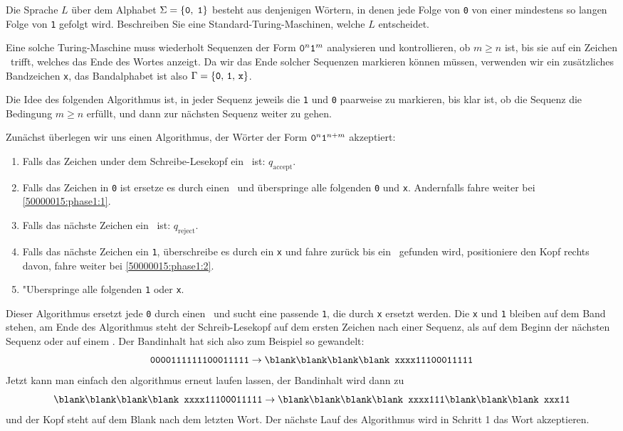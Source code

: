 Die Sprache $L$ über dem Alphabet $\Sigma = \{{\tt 0},\;{\tt 1}\}$
besteht aus denjenigen Wörtern, in denen jede Folge von {\tt 0}
von einer mindestens so langen Folge von {\tt 1} gefolgt wird.
Beschreiben Sie eine Standard-Turing-Maschinen, welche $L$
entscheidet.

\begin{loesung}
Eine solche Turing-Maschine muss wiederholt Sequenzen der
Form ${\tt 0}^n{\tt 1}^m$ analysieren und kontrollieren, ob $m \ge n$ ist,
bis sie auf ein Zeichen \blank\ trifft, welches das Ende des
Wortes anzeigt. Da wir das Ende solcher Sequenzen markieren 
können müssen, verwenden wir ein zusätzliches Bandzeichen
{\tt x}, das Bandalphabet ist also $\Gamma
=\{{\tt 0},\,{\tt 1},\,{\tt x}\}$.

Die Idee des folgenden Algorithmus ist, in jeder Sequenz jeweils
die {\tt 1} und {\tt 0} paarweise zu markieren, bis klar ist,
ob die Sequenz die Bedingung $m\ge n$ erfüllt, und dann zur
nächsten Sequenz weiter zu gehen.

Zunächst überlegen wir uns einen Algorithmus, der Wörter der Form
${\tt 0}^n{\tt 1}^{n+m}$ akzeptiert:
\begin{enumerate}
\item Falls das Zeichen under dem Schreibe-Lesekopf ein \blank\ ist:
$q_\text{accept}$.
\item
\label{50000015:phase1:2}
Falls das Zeichen in {\tt 0} ist ersetze es durch einen \blank\ und
überspringe alle folgenden {\tt 0} und {\tt x}.
Andernfalls fahre weiter bei \ref{50000015:phase1:1}.
\item
Falls das nächste Zeichen ein \blank\ ist: $q_\text{reject}$.
\item
Falls das nächste Zeichen ein {\tt 1}, überschreibe es durch ein {\tt x}
und fahre zurück bis ein \blank\ gefunden wird, positioniere den Kopf
rechts davon, fahre weiter bei \ref{50000015:phase1:2}.
\item
\label{50000015:phase1:1}
"Uberspringe alle folgenden {\tt 1} oder {\tt x}.
\end{enumerate}
Dieser Algorithmus ersetzt jede {\tt 0} durch einen \blank\ und sucht eine
passende {\tt 1}, die durch {\tt x} ersetzt werden.
Die {\tt x} und {\tt 1} bleiben auf dem Band stehen, am Ende des Algorithmus
steht der Schreib-Lesekopf auf dem ersten Zeichen nach einer Sequenz,
als auf dem Beginn der nächsten Sequenz oder auf einem \blank.
Der Bandinhalt hat sich also zum Beispiel so gewandelt:
\[
\text {\tt 0000111111100011111}
\rightarrow
\text {\tt \blank\blank\blank\blank xxxx11100011111}
\]
Jetzt kann man einfach den algorithmus erneut laufen lassen, der Bandinhalt
wird dann zu
\[
\text {\tt \blank\blank\blank\blank xxxx11100011111}
\rightarrow
\text {\tt \blank\blank\blank\blank xxxx111\blank\blank\blank xxx11}
\]
und der Kopf steht auf dem Blank nach dem letzten Wort.
Der nächste Lauf des Algorithmus wird in Schritt 1 das Wort akzeptieren.


\end{loesung}
